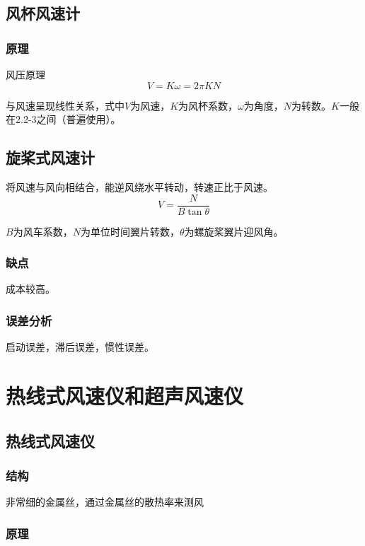 \documentclass[UTF8,11pt]{ctexbook}
\begin{document}
\subsection{风杯风速计}

\subsubsection{原理}

风压原理
\[
V=K\omega=2\pi KN
\]

与风速呈现线性关系，式中\(V\)为风速，\(K\)为风杯系数，\(\omega\)为角度，\(N\)为转数。\(K\)一般在2.2-3之间（普遍使用）。

\subsection{旋桨式风速计}

将风速与风向相结合，能逆风绕水平转动，转速正比于风速。
\[
V=\frac{N}{B\tan\theta}
\]

\(B\)为风车系数，\(N\)为单位时间翼片转数，\(\theta\)为螺旋桨翼片迎风角。

\subsubsection{缺点}

成本较高。

\subsubsection{误差分析}

启动误差，滞后误差，惯性误差。

\section{热线式风速仪和超声风速仪}

\subsection{热线式风速仪}

\subsubsection{结构}

非常细的金属丝，通过金属丝的散热率来测风

\subsubsection{原理}
\end{document}
